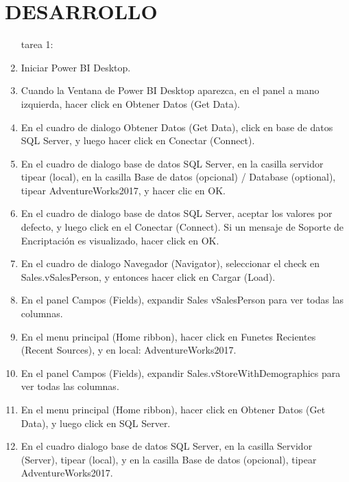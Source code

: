 \section{DESARROLLO} 

\begin{enumerate}[1.]

    \item[tarea 1:]

	\item 	Iniciar Power BI Desktop. 
	
    \item 	 Cuando la Ventana de Power BI Desktop aparezca, en el panel a mano izquierda, hacer click en Obtener Datos (Get Data). 
    
	\item 	 En el cuadro de dialogo Obtener Datos (Get Data), click en base de datos SQL Server, y luego hacer click en Conectar (Connect). 
	
	\item 	 En el cuadro de dialogo base de datos SQL Server, en la casilla servidor tipear (local), en la casilla Base de datos (opcional) / Database (optional), tipear AdventureWorks2017, y hacer clic en OK.
	
    \item 	 En el cuadro de dialogo base de datos SQL Server, aceptar los valores por defecto, y luego click en el Conectar (Connect). Si un mensaje de Soporte de Encriptación es visualizado, hacer click en OK. 
    \item 	 En el cuadro de dialogo Navegador (Navigator), seleccionar el check en Sales.vSalesPerson, y entonces hacer click en Cargar (Load). 
	
	\item 	En el panel Campos (Fields), expandir Sales vSalesPerson para ver todas las columnas.  
	
    \item 	  En el menu principal (Home ribbon), hacer click en Funetes Recientes (Recent Sources), y en local:
AdventureWorks2017. 
    
	 
	
	\item 	 En el panel Campos (Fields), expandir Sales.vStoreWithDemographics para ver todas las columnas. 
	
    \item 	  En el menu principal (Home ribbon), hacer click en Obtener Datos (Get Data), y luego click en SQL Server. 
    \item 	  En el cuadro dialogo base de datos SQL Server, en la casilla Servidor (Server), tipear (local), y en la casilla Base de datos (opcional), tipear AdventureWorks2017. 
	

\end{enumerate}
